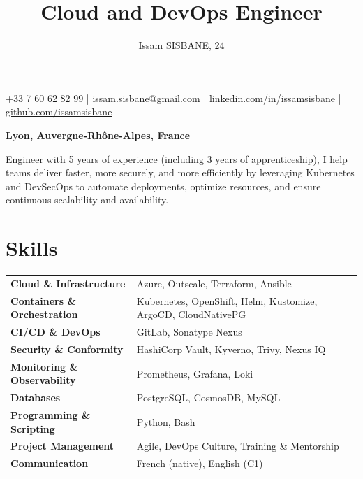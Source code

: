 \documentclass{article}
\title{Cloud and DevOps Engineer}
\author{Issam SISBANE, 24}
\date{}
\begin{document}
\maketitle
\thispagestyle{empty} %
\vspace{-4em}

\begin{center}
+33 7 60 62 82 99 | \href{mailto:issam.sisbane@gmail.com}{\underline{issam.sisbane@gmail.com}} | \href{https://linkedin.com/in/issamsisbane}{\underline{linkedin.com/in/issamsisbane}} | \href{https://github.com/issamsisbane}{\underline{github.com/issamsisbane}}
\end{center}
\begin{center}
\textbf{Lyon, Auvergne-Rhône-Alpes, France}
\end{center}


\begin{center}
Engineer with 5 years of experience (including 3 years of apprenticeship), I help teams deliver faster, more securely, and more efficiently by leveraging Kubernetes and DevSecOps to automate deployments, optimize resources, and ensure continuous scalability and availability.
\end{center}

\section*{Skills}
\begin{tabularx}{\textwidth}{@{}lX@{}}
  \textbf{Cloud \& Infrastructure} & Azure, Outscale, Terraform, Ansible \\
  \addlinespace[2pt]
  \textbf{Containers \& Orchestration} & Kubernetes, OpenShift, Helm, Kustomize, ArgoCD, CloudNativePG \\
  \addlinespace[2pt]
  \textbf{CI/CD \& DevOps} & GitLab, Sonatype Nexus \\
  \addlinespace[2pt]
  \textbf{Security \& Conformity} & HashiCorp Vault, Kyverno, Trivy, Nexus IQ \\
  \addlinespace[2pt]
  \textbf{Monitoring \& Observability} & Prometheus, Grafana, Loki \\
  \addlinespace[2pt]
  \textbf{Databases} & PostgreSQL, CosmosDB, MySQL \\
  \addlinespace[2pt]
  \textbf{Programming \& Scripting} & Python, Bash \\
  \addlinespace[2pt]
  \textbf{Project Management} & Agile, DevOps Culture, Training \& Mentorship \\
  \addlinespace[2pt]
  \textbf{Communication} & French (native), English (C1) \\
\end{tabularx}
\end{document}
